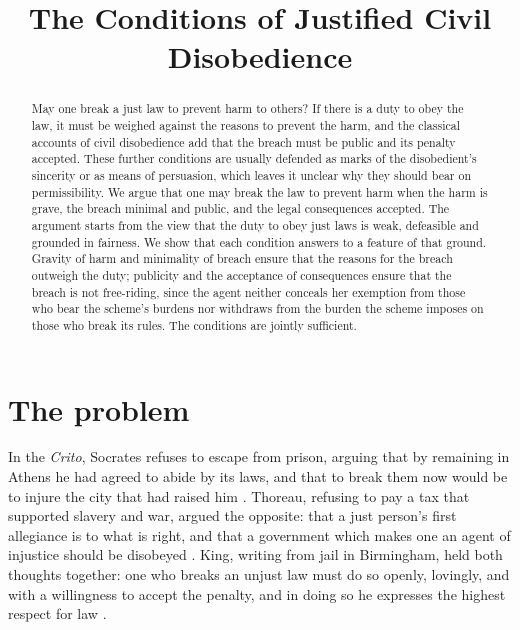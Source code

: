 \documentclass{situationist-preprint}
\title{The Conditions of Justified Civil Disobedience}
\begin{document}
\maketitle

\begin{abstract}
May one break a just law to prevent harm to others? If there is a duty to obey the law, it must be weighed against the reasons to prevent the harm, and the classical accounts of civil disobedience add that the breach must be public and its penalty accepted. These further conditions are usually defended as marks of the disobedient's sincerity or as means of persuasion, which leaves it unclear why they should bear on permissibility. We argue that one may break the law to prevent harm when the harm is grave, the breach minimal and public, and the legal consequences accepted. The argument starts from the view that the duty to obey just laws is weak, defeasible and grounded in fairness. We show that each condition answers to a feature of that ground. Gravity of harm and minimality of breach ensure that the reasons for the breach outweigh the duty; publicity and the acceptance of consequences ensure that the breach is not free-riding, since the agent neither conceals her exemption from those who bear the scheme's burdens nor withdraws from the burden the scheme imposes on those who break its rules. The conditions are jointly sufficient.
\end{abstract}

\section{The problem}

In the \emph{Crito}, Socrates refuses to escape from prison, arguing that by remaining in Athens he had agreed to abide by its laws, and that to break them now would be to injure the city that had raised him \citep[50a--54d]{PlatoCrito}. Thoreau, refusing to pay a tax that supported slavery and war, argued the opposite: that a just person's first allegiance is to what is right, and that a government which makes one an agent of injustice should be disobeyed \citep{Thoreau1849}. King, writing from jail in Birmingham, held both thoughts together: one who breaks an unjust law must do so openly, lovingly, and with a willingness to accept the penalty, and in doing so he expresses the highest respect for law \citep{King1964}.
\end{document}
